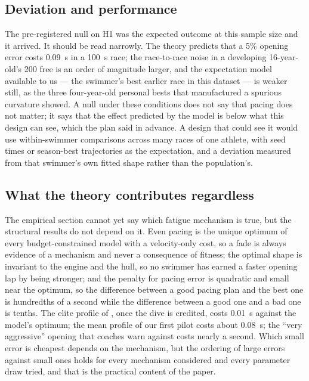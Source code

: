 \subsection{Deviation and performance}

The pre-registered null on H1 was the expected outcome at this sample size
and it arrived. It should be read narrowly. The theory predicts that a 5\%
opening error costs 0.09~s in a 100~s race; the race-to-race noise in a
developing 16-year-old's 200 free is an order of magnitude larger, and the
expectation model available to us --- the swimmer's best earlier race in
this dataset --- is weaker still, as the three four-year-old personal bests
that manufactured a spurious curvature showed. A null under these
conditions does not say that pacing does not matter; it says that the
effect predicted by the model is below what this design can see, which the
plan said in advance. A design that could see it would use within-swimmer
comparisons across many races of one athlete, with seed times or
season-best trajectories as the expectation, and a deviation measured from
that swimmer's own fitted shape rather than the population's.

\subsection{What the theory contributes regardless}

The empirical section cannot yet say which fatigue mechanism is true, but
the structural results do not depend on it. Even pacing is the unique
optimum of every budget-constrained model with a velocity-only cost, so a
fade is always evidence of a mechanism and never a consequence of fitness;
the optimal shape is invariant to the engine and the hull, so no swimmer
has earned a faster opening lap by being stronger; and the penalty for
pacing error is quadratic and small near the optimum, so the difference
between a good pacing plan and the best one is hundredths of a second while
the difference between a good one and a bad one is tenths. The elite
profile of \citet{robertson2009analysis}, once the dive is credited, costs
0.01~s against the model's optimum; the mean profile of our first pilot
costs about 0.08~s; the ``very aggressive'' opening that coaches warn
against costs nearly a second. Which small error is cheapest depends on
the mechanism, but the ordering of large errors against small ones holds
for every mechanism considered and every parameter draw tried, and that is
the practical content of the paper.
